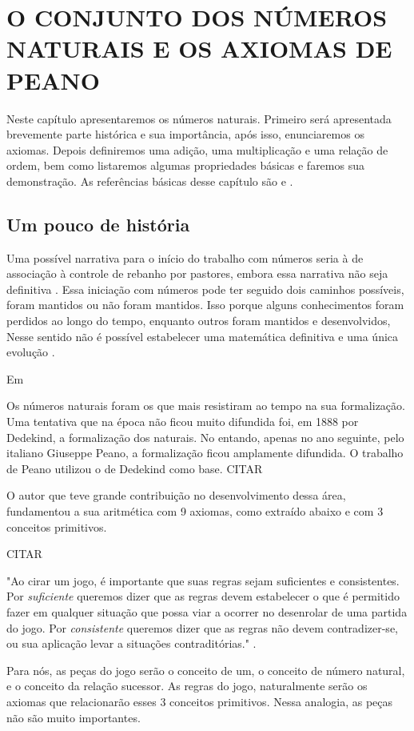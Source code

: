 \documentclass[../main.tex]{subfiles}
\begin{document}
\chapter{O CONJUNTO DOS NÚMEROS NATURAIS E OS AXIOMAS DE PEANO}
Neste capítulo apresentaremos os números naturais. Primeiro será apresentada brevemente parte histórica e sua importância, após isso, enunciaremos os axiomas. Depois definiremos uma adição, uma multiplicação e uma relação de ordem, bem como listaremos algumas propriedades básicas e faremos sua demonstração. As referências básicas desse capítulo são \cite{domingues-2009} e \cite{ferreira}.

\section{Um pouco de história}

Uma possível narrativa para o início do trabalho com números seria à de associação à controle de rebanho por pastores, embora essa narrativa não seja definitiva \cite{roque}. Essa iniciação com números pode ter seguido dois caminhos possíveis, foram mantidos ou não foram mantidos. Isso porque alguns conhecimentos foram perdidos ao longo do tempo, enquanto outros foram mantidos e desenvolvidos, Nesse sentido não é possível estabelecer uma matemática definitiva e uma única evolução \cite[p. 35]{roque}. 

Em 

Os números naturais foram os que mais resistiram ao tempo na sua formalização. Uma tentativa que na época não ficou muito difundida foi, em 1888 por Dedekind, a formalização dos naturais. No entando, apenas no ano seguinte, pelo italiano Giuseppe Peano, a formalização ficou amplamente difundida. O trabalho de Peano utilizou o de Dedekind como base. CITAR

O autor que teve grande contribuição no desenvolvimento dessa área, \cite{peano} fundamentou a sua aritmética com 9 axiomas, como extraído abaixo e com 3 conceitos primitivos.

CITAR

"Ao cirar um jogo, é importante que suas regras sejam suficientes e consistentes. Por \emph{suficiente} queremos dizer que as regras devem estabelecer o que é permitido fazer em qualquer situação que possa viar a ocorrer no desenrolar de uma partida do jogo. Por \emph{consistente} queremos dizer que as regras não devem contradizer-se, ou sua aplicação levar a situações contraditórias." \cite{barbosa}.

Para nós, as peças do jogo serão o conceito de um, o conceito de número natural, e o conceito da relação sucessor. As regras do jogo, naturalmente serão os axiomas que relacionarão esses 3 conceitos primitivos. Nessa analogia, as peças não são muito importantes.
\end{document}
